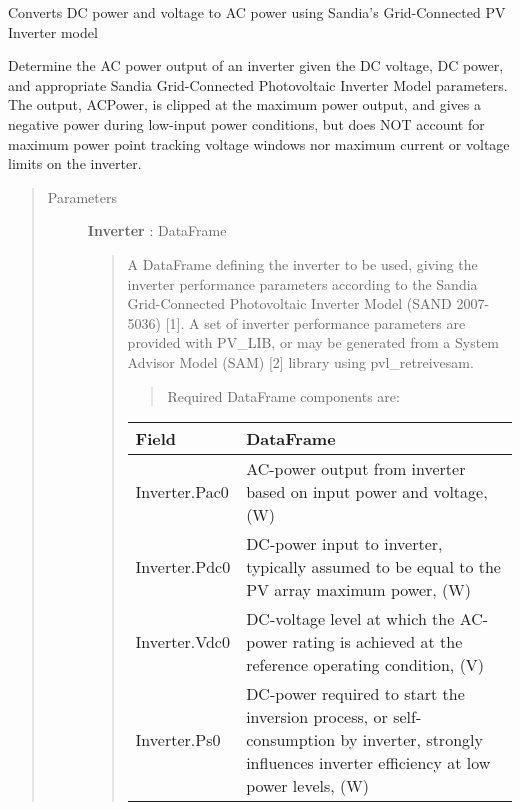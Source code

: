 \documentclass[letterpaper,10pt,english]{sphinxmanual}
\begin{document}
\begin{fulllineitems}
\label{stubs/pvlib.pvl_snlinverter:pvlib.pvl_snlinverter}
Converts DC power and voltage to AC power using Sandia's Grid-Connected PV Inverter model

Determine the AC power output of an inverter given the DC voltage, DC
power, and appropriate Sandia Grid-Connected Photovoltaic Inverter
Model parameters. The output, ACPower, is clipped at the maximum power
output, and gives a negative power during low-input power conditions,
but does NOT account for maximum power point tracking voltage windows
nor maximum current or voltage limits on the inverter.
\begin{quote}\begin{description}
\item[{Parameters}] \leavevmode
\textbf{Inverter} : DataFrame
\begin{quote}

A DataFrame defining the inverter to be used, giving the
inverter performance parameters according to the Sandia
Grid-Connected Photovoltaic Inverter Model (SAND 2007-5036) {[}1{]}. A set of
inverter performance parameters are provided with PV\_LIB, or may be
generated from a System Advisor Model (SAM) {[}2{]} library using pvl\_retreivesam.
\begin{quote}

Required DataFrame components are:
\end{quote}

\begin{tabulary}{\linewidth}{|L|L|}
\hline
\textsf{\relax 
Field
} & \textsf{\relax 
DataFrame
}\\
\hline
Inverter.Pac0
 & 
AC-power output from inverter based on input power and voltage, (W)
\\

Inverter.Pdc0
 & 
DC-power input to inverter, typically assumed to be equal to the PV array maximum power, (W)
\\

Inverter.Vdc0
 & 
DC-voltage level at which the AC-power rating is achieved at the reference operating condition, (V)
\\

Inverter.Ps0
 & 
DC-power required to start the inversion process, or self-consumption by inverter, strongly influences inverter efficiency at low power levels, (W)
\\


\end{tabulary}
\end{quote}
\end{description}
\end{quote}
\end{fulllineitems}
\end{document}
